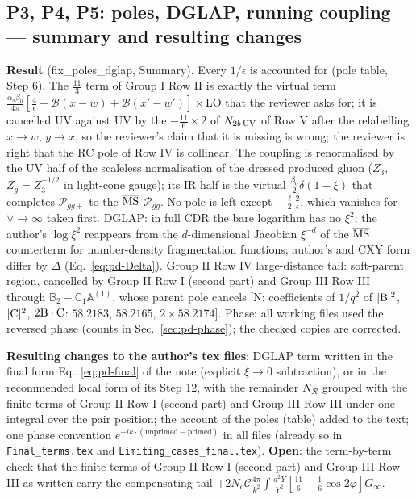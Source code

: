 \documentclass[10pt]{article}
\def\mf#1{\mathbb{#1}}
\begin{document}
\subsection{P3, P4, P5: poles, DGLAP, running coupling --- summary and resulting changes}\label{sec:fix-poles}
\noindent\textbf{Result} (fix\_poles\_dglap, Summary). Every $1/\epsilon$ is accounted for (pole table, Step 6). The $\frac{11}{3}$ term of Group I Row II is exactly the virtual term $\frac{\alpha_{s}\beta_{0}}{4\pi}[\frac{4}{\epsilon}+\mathcal{B}(x-w)+\mathcal{B}(x'-w')]\times$LO that the reviewer asks for; it is cancelled UV against UV by the $-\frac{11}{6}\times2$ of $N_{2b\,\rm UV}$ of Row V after the relabelling $x\to w$, $y\to x$, so the reviewer's claim that it is missing is wrong; the reviewer is right that the RC pole of Row IV is collinear. The coupling is renormalised by the UV half of the scaleless normalisation of the dressed produced gluon ($Z_{3}$, $Z_{g}=Z_{3}^{-1/2}$ in light-cone gauge); its IR half is the virtual $\frac{\beta_{0}}{2}\delta(1-\xi)$ that completes $\mathcal{P}_{gg+}$ to the $\overline{\rm MS}$ $\mathcal{P}_{gg}$. No pole is left except $-\frac{\ell}{2}\frac{2}{\epsilon}$, which vanishes for $\vee\to\infty$ taken first. DGLAP: in full CDR the bare logarithm has no $\xi^{2}$; the author's $\log\xi^{2}$ reappears from the $d$-dimensional Jacobian $\xi^{-d}$ of the $\overline{\rm MS}$ counterterm for number-density fragmentation functions; author's and CXY form differ by $\Delta$ (Eq.~\eqref{eq:pd-Delta}). Group II Row IV large-distance tail: soft-parent region, cancelled by Group II Row I (second part) and Group III Row III through $\mf{B}_{2}-\mf{C}_{1}\mf{A}^{(1)}$, whose parent pole cancels [N: coefficients of $1/q^{2}$ of $|{\rm B}|^{2}$, $|{\rm C}|^{2}$, $2{\rm B}\cdot{\rm C}$: $58.2183$, $58.2165$, $2\times58.2174$]. Phase: all working files used the reversed phase (counts in Sec.~\ref{sec:pd-phase}); the checked copies are corrected.

\noindent\textbf{Resulting changes to the author's tex files}: DGLAP term written in the final form Eq.~\eqref{eq:pd-final} of the note (explicit $\xi\to0$ subtraction), or in the recommended local form of its Step 12, with the remainder $N_{\mathcal{R}}$ grouped with the finite terms of Group II Row I (second part) and Group III Row III under one integral over the pair position; the account of the poles (table) added to the text; one phase convention $e^{-ik\cdot(\text{unprimed}-\text{primed})}$ in all files (already so in \texttt{Final\_terms.tex} and \texttt{Limiting\_cases\_final.tex}). \textbf{Open}: the term-by-term check that the finite terms of Group II Row I (second part) and Group III Row III as written carry the compensating tail $+2N_{c}\mathcal{C}\frac{4\pi}{k^{2}}\int\frac{d^{2}Y}{Y^{2}}[\frac{11}{6}-\frac16\cos2\varphi]G_{\infty}$.
\end{document}
